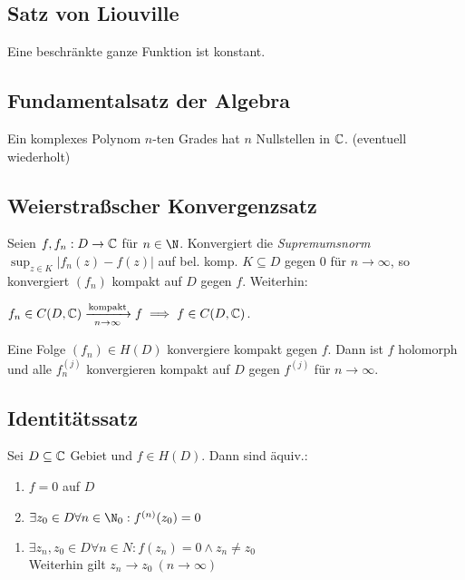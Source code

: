 \subsection*{Satz von Liouville}

Eine beschränkte ganze Funktion ist konstant.

\subsection*{Fundamentalsatz der Algebra}

Ein komplexes Polynom $n$-ten Grades hat $n$ Nullstellen in $\mathbb{C}$. (eventuell wiederholt)

\subsection*{Weierstraßscher Konvergenzsatz}

Seien $f, f_n : D \to \mathbb{C}$ für $n \in \N$. Konvergiert die \emph{Supremumsnorm} $\sup_{z \in K} |f_n(z)-f(z)|$ auf bel. komp. $K \subseteq D$ gegen $0$ für $n \to \infty$, so konvergiert $(f_n)$ kompakt auf $D$ gegen $f$. Weiterhin:

\spacing

$f_n \in C(D,\mathbb{C}) \xrightarrow[n \to \infty]{\text{kompakt}} f \implies f \in C(D,\mathbb{C})$.

\spacing

Eine Folge $(f_n) \in H(D)$ konvergiere kompakt gegen $f$. Dann ist $f$ holomorph und alle $f_n^{(j)}$ konvergieren kompakt auf $D$ gegen $f^{(j)}$ für $n \to \infty$.

\subsection*{Identitätssatz}

Sei $D \subseteq \mathbb{C}$ Gebiet und $f \in H(D)$. Dann sind äquiv.:

\begin{enumerate}[label=(\alph*)]
	\item $f = 0$ auf $D$
	\item $\exists z_0 \in D \forall n \in \N_0 : f^{(n)}(z_0) = 0$
\end{enumerate}

\columnbreak

\begin{enumerate}[label=(\alph*),resume]
	\item $\exists z_n, z_0 \in D \forall n \in N : f(z_n) = 0 \land z_n \neq z_0$ \\ Weiterhin gilt $z_n \to z_0 \ (n \to \infty)$
\end{enumerate}

